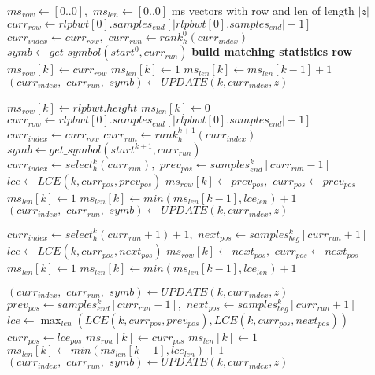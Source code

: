 \documentclass[a4paper,12pt, oneside]{book}
\begin{document}
\begin{algorithm}
  \scriptsize
  \begin{algorithmic}[1]
    \State $ms_{row}\gets [0..0],\,\,ms_{len}\gets [0..0]$
    \Comment ms vectors with row and len of length $|z|$
    \State $curr_{row}\gets
    rlpbwt[0].samples_{end}[|rlpbwt[0].samples_{end}|-1]$
    \State $curr_{index}\gets curr_{row},\,\,curr_{run}\gets
    rank_h^0(curr_{index})$ 
    \State $symb\gets get\_symbol(start^0, curr_{run})$
    \Comment \textbf{build matching statistics row}
    \For {\textit{every} $k\in[0, |z|)$}
    \State $ms_{row}[k]\gets curr_{row}$
    \State $ms_{len}[k] \gets 1$
    \Else
    \State $ms_{len}[k] \gets ms_{len}[k-1]+1$
    \EndIf
     \State $(curr_{index},\,\,curr_{run},\,\,symb)\gets UPDATE(k, curr_{index},
    z)$ 
    \EndIf
    \Else
    
    \State $ms_{row}[k]\gets rlpbwt.height$
    \State $ms_{len}[k]\gets 0$
    \State $curr_{row}\gets
    rlpbwt[0].samples_{end}[|rlpbwt[0].samples_{end}|-1]$
    \State $curr_{index}\gets curr_{row}$
    \State $curr_{run}\gets rank_h^{k+1}(curr_{index})$
    \State $symb\gets get\_symbol(start^{k+1}, curr_{run})$
    \EndIf
    \Else
    \State $curr_{index}\gets select_h^k(curr_{run}),\,\,prev_{pos}\gets
    samples_{end}^k[curr_{run}-1]$ 
    \State $lce\gets LCE(k, curr_{pos}, prev_{pos})$
    \State $ms_{row}[k]\gets prev_{pos},\,\,curr_{pos}\gets prev_{pos}$
    \State $ms_{len}[k] \gets 1$
    \Else
    \State $ms_{len}[k] \gets min(ms_{len}[k-1], lce_{len})+1$
    \EndIf
    \State $(curr_{index},\,\,curr_{run},\,\,symb)\gets UPDATE(k, curr_{index},
    z)$  
    \EndIf
    
    \State $curr_{index}\gets select_h^k(curr_{run}+1)+1,\,\,next_{pos}\gets
    samples_{beg}^k[curr_{run}+1]$ 
    \State $lce\gets LCE(k, curr_{pos}, next_{pos})$
    \State $ms_{row}[k]\gets next_{pos},\,\,curr_{pos}\gets next_{pos}$
    \State $ms_{len}[k] \gets 1$
    \Else
    \State $ms_{len}[k] \gets min(ms_{len}[k-1], lce_{len})+1$
    \EndIf
  
    \State $(curr_{index},\,\,curr_{run},\,\,symb)\gets UPDATE(k, curr_{index},
    z)$ 
    \EndIf
    \Else
    \State $prev_{pos}\gets samples_{end}^k[curr_{run}-1],\,\,next_{pos}\gets
    samples_{beg}^k[curr_{run}+1]$ 
    \State $lce\gets \max_{len} (LCE(k, curr_{pos}, prev_{pos}), LCE(k,
    curr_{pos}, next_{pos}))$
    \State $curr_{pos}\gets lce_{pos}$
    \State $ms_{row}[k]\gets curr_{pos}$
    \State $ms_{len}[k] \gets 1$
    \Else
    \State $ms_{len}[k] \gets min(ms_{len}[k-1], lce_{len})+1$
    \EndIf
    \State $(curr_{index},\,\,curr_{run},\,\,symb)\gets UPDATE(k, curr_{index},
    z)$ 
    \EndIf
    \EndIf
    \EndIf
    \EndIf
    \EndFor
    

\end{algorithmic}
\end{algorithm}
\end{document}
